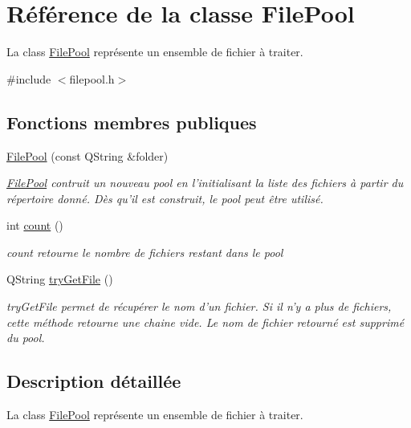 \hypertarget{class_file_pool}{\section{Référence de la classe File\+Pool}
\label{class_file_pool}
}


La class \hyperlink{class_file_pool}{File\+Pool} représente un ensemble de fichier à traiter.  




{\ttfamily \#include $<$filepool.\+h$>$}

\subsection*{Fonctions membres publiques}
\begin{DoxyCompactItemize}
\item 
\hyperlink{class_file_pool_a7732f184a14aaf0db1f9f9e5a27f2504}{File\+Pool} (const Q\+String \&folder)
\begin{DoxyCompactList}\small\item\em \hyperlink{class_file_pool}{File\+Pool} contruit un nouveau pool en l'initialisant la liste des fichiers à partir du répertoire donné. Dès qu'il est construit, le pool peut être utilisé. \end{DoxyCompactList}\item 
int \hyperlink{class_file_pool_abdd3209d2afb8f8ba350901871286908}{count} ()
\begin{DoxyCompactList}\small\item\em count retourne le nombre de fichiers restant dans le pool \end{DoxyCompactList}\item 
Q\+String \hyperlink{class_file_pool_a520090a5679eb3270186dbec0c84c204}{try\+Get\+File} ()
\begin{DoxyCompactList}\small\item\em try\+Get\+File permet de récupérer le nom d'un fichier. Si il n'y a plus de fichiers, cette méthode retourne une chaine vide. Le nom de fichier retourné est supprimé du pool. \end{DoxyCompactList}\end{DoxyCompactItemize}


\subsection{Description détaillée}
La class \hyperlink{class_file_pool}{File\+Pool} représente un ensemble de fichier à traiter. 

